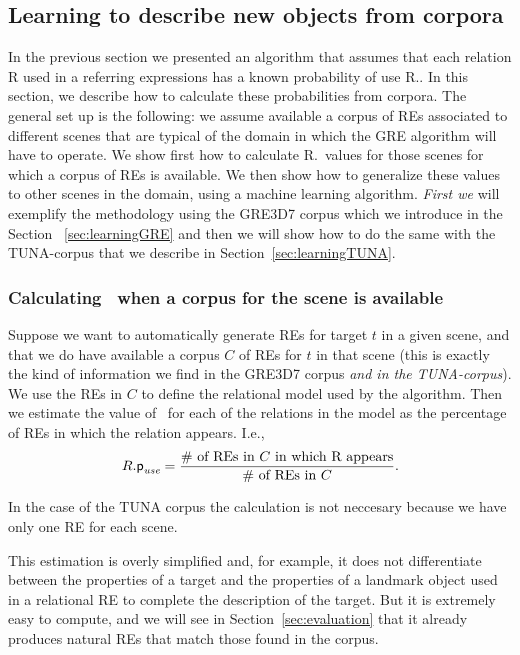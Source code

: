 \subsection{Learning to describe new objects from corpora}
\label{sec:learning}

In the previous section we presented an algorithm that assumes that
each relation R used in a referring expressions has a known
probability of use R.\puse. In this section, we describe how to
calculate these probabilities from corpora.  The general set up is the
following: we assume available a corpus of REs associated to different
scenes that are typical of the domain in which the GRE algorithm will
have to operate.  We show first how to calculate R.\puse\ values for
those scenes for which a corpus of REs is available.  We then show how
to generalize these values to other scenes in the domain, using a
machine learning algorithm. \textit{First we} will exemplify the
methodology using the GRE3D7 corpus which we introduce in the Section
~\ref{sec:learningGRE} and then we will show how to do the same with
the TUNA-corpus that we describe in Section~\ref{sec:learningTUNA}.

\subsubsection{Calculating \puse\ when a corpus for the scene is available}

Suppose we want to automatically generate REs for target $t$ in a
given scene, and that we do have available a corpus $C$ of REs for $t$
in that scene (this is exactly the kind of information we find in the
GRE3D7 corpus \textit{and in the TUNA-corpus}).  We use the REs in $C$
to define the relational model used by the algorithm.  Then we
estimate the value of \puse\ for each of the relations in the model as
the percentage of REs in which the relation appears.  I.e.,
\begin{equation}\label{eq1}
R.\textsf{p}_\textit{use} = \frac{\# \mbox{ of REs in $C$ in which R appears}}{\# \mbox{ of REs in $C$}}.
\end{equation}

In the case of the TUNA corpus the calculation is not neccesary
because we have only one RE for each scene.

This estimation is overly simplified and, for example, it does not
differentiate between the properties of a target and the properties of
a landmark object used in a relational RE to complete the description
of the target.  But it is extremely easy to compute, and we will see
in Section~\ref{sec:evaluation} that it already produces natural REs
that match those found in the corpus.

